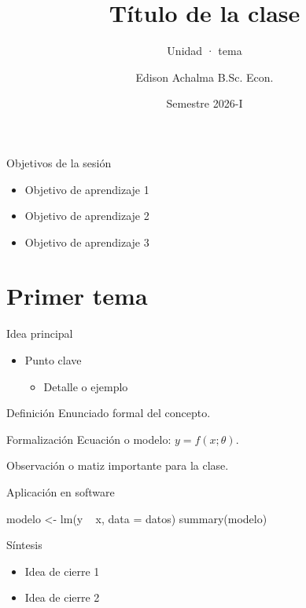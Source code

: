 \documentclass{academic-beamer}
\title{Título de la clase}
\subtitle{Unidad · tema}
\author{Edison Achalma B.Sc. Econ.}
\institute{Universidad Nacional de San Cristóbal de Huamanga}
\date{Semestre 2026-I}
\begin{document}
\begin{frame}\titlepage\end{frame}

\begin{frame}{Objetivos de la sesión}
\begin{itemize}
  \item Objetivo de aprendizaje 1
  \item Objetivo de aprendizaje 2
  \item Objetivo de aprendizaje 3
\end{itemize}
\end{frame}

\section{Primer tema}
\begin{frame}{Idea principal}
\begin{itemize}
  \item Punto clave
  \begin{itemize}\item Detalle o ejemplo\end{itemize}
\end{itemize}
\begin{block}{Definición}
Enunciado formal del concepto.
\end{block}
\end{frame}

\begin{frame}{Formalización}
Ecuación o modelo: $\displaystyle y = f(x;\theta)$.
\begin{nota} Observación o matiz importante para la clase. \end{nota}
\end{frame}

\begin{frame}[fragile]{Aplicación en software}
\begin{codigo}[language=R]
modelo <- lm(y ~ x, data = datos)
summary(modelo)
\end{codigo}
\end{frame}

\begin{frame}{Síntesis}
\begin{itemize}
  \item Idea de cierre 1
  \item Idea de cierre 2
\end{itemize}
\end{frame}
\end{document}
